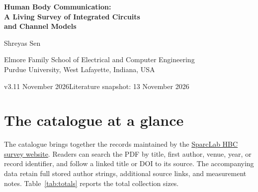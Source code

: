 \documentclass[10pt,letterpaper]{article}
\newcommand{\snapshot}{13 November 2026}
\newcommand{\website}{\href{https://engineering.purdue.edu/~shreyas/SparcLab/HBC_Survey.html}{SparcLab HBC survey website}}
\begin{document}
\thispagestyle{plain}
\begin{center}
{\LARGE\bfseries\color{surveyblack}Human Body Communication:\\[5pt]
A Living Survey of Integrated Circuits\\[5pt]
and Channel Models\par}
\vspace{10pt}
{\large Shreyas Sen}\par
{\small Elmore Family School of Electrical and Computer Engineering\\
Purdue University, West Lafayette, Indiana, USA}\par
\vspace{3pt}
{\small v3.11\quad\textbar{} November 2026\quad\textbar\quad Literature snapshot: \snapshot}
\end{center}
\vspace{2pt}
\begin{abstract}
This manuscript provides a fixed, searchable edition of the SparcLab human body communication (HBC) literature catalogue. Its purpose is to collect the publications in one place and make progress in integrated-circuit (IC) energy efficiency visible through publication-year plots. The \snapshot\ snapshot contains 337 records: 103 IC publications, 147 channel/model publications, and 87 other references. All records are listed in a compact bibliography with stable identifiers and source links where available. IC plots begin in 2006, the earliest year represented in the IC collection, and display transmitter, receiver, and combined transmitter--receiver energy separately. Machine-readable bibliographic and measurement files accompany the manuscript. The resource supports publication discovery and inspection of archived IC performance data.
\end{abstract}

\section{The catalogue at a glance}
The catalogue brings together the records maintained by the \website. Readers can search the PDF by title, first author, venue, year, or record identifier, and follow a linked title or DOI to its source. The accompanying data retain full stored author strings, additional source links, and measurement notes. Table~\ref{tab:totals} reports the total collection sizes.
\end{document}
